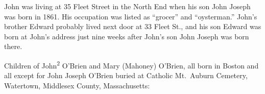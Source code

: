 John was living at 35 Fleet Street in the North End when his son John Joseph was born in 1861. His occupation was listed as ``grocer''\cite{John3OBrienBirth:2,Wards:2} and ``oysterman.''\cite{1861John2OBrien:2} John's brother Edward probably lived next door at 33 Fleet St.,\cite{1861EdwardOBrien} and his son Edward was born at John's address just nine weeks after John's son John Joseph was born there.\cite{John3OBrienBirth:3}

\begin{KidsIntro}
	Children of John\textsuperscript{2} O'Brien and Mary (Mahoney) O'Brien, all born in Boston and all except for John Joseph O'Brien buried at Catholic Mt.\ Auburn Cemetery, Watertown, Middlesex County, Massachusetts:\cite{BillMcEvoy:3}
\end{KidsIntro}

